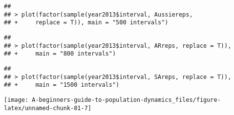 \documentclass[]{book}
\begin{document}
\begin{verbatim}
## 
## > plot(factor(sample(year2013$interval, Aussiereps, 
## +     replace = T)), main = "500 intervals")
\end{verbatim}

\begin{verbatim}
## 
## > plot(factor(sample(year2013$interval, ARreps, replace = T)), 
## +     main = "800 intervals")
\end{verbatim}

\begin{verbatim}
## 
## > plot(factor(sample(year2013$interval, SAreps, replace = T)), 
## +     main = "1500 intervals")
\end{verbatim}

\begin{center}\texttt{[image: A-beginners-guide-to-population-dynamics\_files/figure-latex/unnamed-chunk-81-7]} \end{center}
\end{document}
